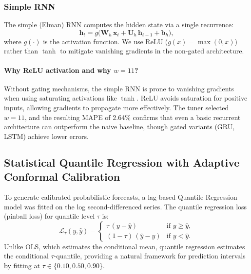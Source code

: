 \documentclass[12pt,a4paper]{article}
\begin{document}
\subsubsection{Simple RNN}

The simple (Elman) RNN computes the hidden state via a single recurrence:
\begin{equation}
  \mathbf{h}_t = g\!\bigl(\mathbf{W}_h\,\mathbf{x}_t + \mathbf{U}_h\,\mathbf{h}_{t-1} + \mathbf{b}_h\bigr),
  \label{eq:rnn}
\end{equation}
where $g(\cdot)$ is the activation function. We use ReLU ($g(x) = \max(0,x)$) rather than $\tanh$ to mitigate vanishing gradients in the non-gated architecture.

\paragraph{Why ReLU activation and why $w = 11$?}
Without gating mechanisms, the simple RNN is prone to vanishing gradients when using saturating activations like $\tanh$. ReLU avoids saturation for positive inputs, allowing gradients to propagate more effectively. The tuner selected $w = 11$, and the resulting MAPE of 2.64\% confirms that even a basic recurrent architecture can outperform the naive baseline, though gated variants (GRU, LSTM) achieve lower errors.

\subsection{Statistical Quantile Regression with Adaptive Conformal Calibration}

To generate calibrated probabilistic forecasts, a lag-based Quantile Regression model \citep{koenker1978} was fitted on the log second-differenced series. The quantile regression loss (pinball loss) for quantile level $\tau$ is:
\begin{equation}
  \mathcal{L}_\tau(y, \hat{y}) =
  \begin{cases}
    \tau\,(y - \hat{y})       & \text{if } y \ge \hat{y}, \\
    (1-\tau)\,(\hat{y} - y)   & \text{if } y < \hat{y}.
  \end{cases}
  \label{eq:pinball}
\end{equation}
Unlike OLS, which estimates the conditional mean, quantile regression estimates the conditional $\tau$-quantile, providing a natural framework for prediction intervals by fitting at $\tau \in \{0.10, 0.50, 0.90\}$.
\end{document}
